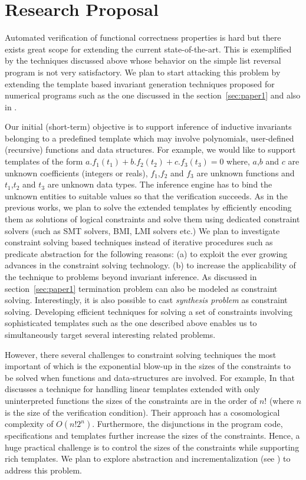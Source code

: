 \section{Research Proposal}

Automated verification of functional correctness properties is hard but there
exists great scope for extending the current state-of-the-art.
This is exemplified by the techniques discussed above whose behavior on the 
simple list reversal program is not very satisfactory.
We plan to start attacking this problem by extending the template based invariant generation 
techniques  proposed for numerical programs such as the one discussed in the 
section~\ref{sec:paper1} and also in \cite{ssriram:SAS04,ssriram:CAV03}. 

Our initial (short-term) objective is to support inference of inductive invariants belonging to a predefined
template which may involve polynomials, user-defined (recursive) functions 
and data structures. For example, we would like to support templates of the form 
$a.f_1(t_1) + b.f_2(t_2) + c.f_3(t_3) = 0$ where, $a$,$b$ and $c$ are unknown coefficients (integers or reals),
$f_1$,$f_2$ and $f_3$ are unknown functions and $t_1$,$t_2$ and $t_3$ are unknown data types.
The inference engine has to bind the unknown entities to suitable values so that the verification 
succeeds. 
As in the previous works, we plan to solve the extended templates by efficiently encoding them as
solutions of logical constraints and solve them using dedicated constraint solvers 
(such as SMT solvers, BMI, LMI solvers etc.)
We plan to investigate constraint solving based techniques instead of iterative procedures such
as predicate abstraction for the following reasons:
(a) to exploit the ever growing advances in the constraint solving technology.
(b) to increase the applicability of the technique to problems beyond invariant inference. 
As discussed in section~\ref{sec:paper1} termination problem can also be modeled as constraint solving. 
Interestingly, it is also possible to cast \emph{synthesis problem} as constraint solving.
Developing efficient techniques for solving a set of constraints involving sophisticated
templates such as the one described above enables us to simultaneously target several interesting
related problems.

However, there several challenges to constraint solving techniques the most important of
which is the exponential blow-up in the sizes of the constraints to be solved when 
functions and data-structures are involved.
For example, In \cite{dirk:VMCAI07} that discusses a technique for handling linear templates 
extended with only uninterpreted functions the sizes of the constraints are in the order of $n!$
(where $n$ is the size of the verification condition). 
Their approach has a cosomological complexity of $O(n!2^n)$.
Furthermore, the disjunctions in the program code, specifications and templates further increase 
the sizes of the constraints.
Hence, a huge practical challenge is to control the sizes of the constraints while supporting
rich templates.
We plan to explore abstraction  and incrementalization (see \cite{dirk:PLDI07}) to address this problem.

